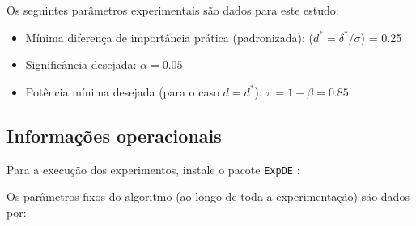 \documentclass[11pt,twoside,printwatermark=false]{pinp}
\providecommand{\tightlist}{%
  \setlength{\itemsep}{0pt}\setlength{\parskip}{0pt}}
\begin{document}
Os seguintes parâmetros experimentais são dados para este estudo:

\begin{itemize}
\tightlist
\item
  Mínima diferença de importância prática (padronizada):
  (\(d^* = \delta^*/\sigma\)) = 0.25
\item
  Significância desejada: \(\alpha = 0.05\)
\item
  Potência mínima desejada (para o caso \(d = d^*\)):
  \(\pi = 1 - \beta = 0.85\) \newpage
\end{itemize}

\subsection{Informações operacionais}\label{informacoes-operacionais}

Para a execução dos experimentos, instale o pacote \texttt{ExpDE}
\citep{Campelo2016}:

\begin{Shaded}
\begin{Highlighting}[]
\NormalTok{(}\NormalTok{)}
\end{Highlighting}
\end{Shaded}

Os parâmetros fixos do algoritmo (ao longo de toda a experimentação) são
dados por:

\begin{Shaded}
\begin{Highlighting}[]
\StringTok{ }\NormalTok{(} \NormalTok{)}
\StringTok{ }\NormalTok{(} \NormalTok{, } \NormalTok{, } \NormalTok{)}
\StringTok{ }\NormalTok{(} \NormalTok{, } \OperatorTok{-}\NormalTok{(}\NormalTok{, }\NormalTok{), }  \OperatorTok{+}\StringTok{ } \OperatorTok{*}\StringTok{ }\NormalTok{(}\NormalTok{, }\NormalTok{))}
\end{Highlighting}
\end{Shaded}
\end{document}
